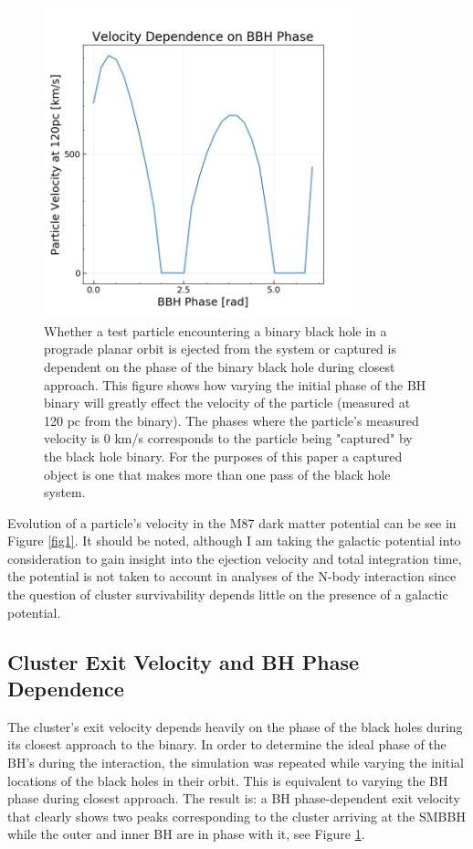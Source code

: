 \documentclass{aastex62}
\begin{document}
\begin{figure}
\includegraphics[width=9cm,height=9cm]{./Images/phase_loop.png}
\centering
\caption{Whether a test particle encountering a binary black hole in a prograde planar orbit is ejected from the system or captured is dependent on the phase of the binary black hole during closest approach. This figure shows how varying the initial phase of the BH binary will greatly effect the velocity of the particle (measured at 120 pc from the binary). The phases where the particle's measured velocity is 0 km/s corresponds to the particle being "captured" by the black hole binary. For the purposes of this paper a captured object is one that makes more than one pass of the black hole system.   \label{fig2}}
\end{figure}

Evolution of a particle's velocity in the M87 dark matter potential can be see in Figure \ref{fig1}. It should be noted, although I am taking the galactic potential into consideration to gain insight into the ejection velocity and total integration time, the potential is not taken to account in analyses of the N-body interaction since the question of cluster survivability depends little on the presence of a galactic potential. 
\subsection{Cluster Exit Velocity and BH Phase Dependence}
The cluster's exit velocity depends heavily on the phase of the black holes during its closest approach to the binary. In order to determine the ideal phase of the BH's during the interaction, the simulation was repeated while varying the initial locations of the black holes in their orbit. This is equivalent to varying the BH phase during closest approach. The result is: a BH phase-dependent exit velocity that clearly shows two peaks corresponding to the cluster arriving at the SMBBH while the outer and inner BH are in phase with it, see Figure \ref{fig2}.
\end{document}
